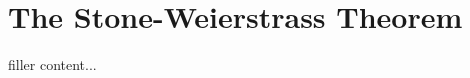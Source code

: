 \section{The Stone-Weierstrass Theorem}\label{sec:the-stone-weierstrass-theorem}

filler content...


